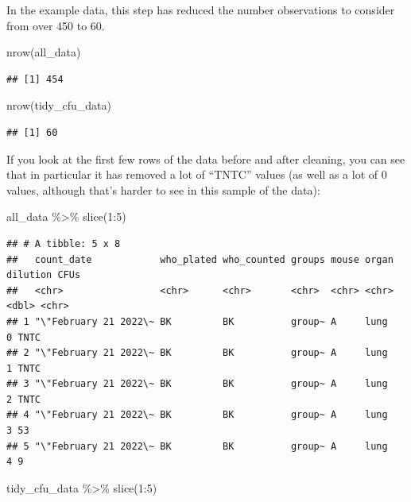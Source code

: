 \documentclass[
]{book}
\newenvironment{Shaded}{\begin{snugshade}}{\end{snugshade}}
\newcommand{\DecValTok}[1]{\textcolor[rgb]{0.00,0.00,0.81}{#1}}
\newcommand{\FunctionTok}[1]{\textcolor[rgb]{0.00,0.00,0.00}{#1}}
\newcommand{\NormalTok}[1]{#1}
\newcommand{\SpecialCharTok}[1]{\textcolor[rgb]{0.00,0.00,0.00}{#1}}
\begin{document}
In the example data, this step has reduced the number observations to consider
from over 450 to 60.

\begin{Shaded}
\begin{Highlighting}[]
\FunctionTok{nrow}\NormalTok{(all\_data)}
\end{Highlighting}
\end{Shaded}

\begin{verbatim}
## [1] 454
\end{verbatim}

\begin{Shaded}
\begin{Highlighting}[]
\FunctionTok{nrow}\NormalTok{(tidy\_cfu\_data)}
\end{Highlighting}
\end{Shaded}

\begin{verbatim}
## [1] 60
\end{verbatim}

If you look at the first few rows of the data before and after cleaning, you can
see that in particular it has removed a lot of ``TNTC'' values (as well as a lot
of 0 values, although that's harder to see in this sample of the data):

\begin{Shaded}
\begin{Highlighting}[]
\NormalTok{all\_data }\SpecialCharTok{\%\textgreater{}\%} 
  \FunctionTok{slice}\NormalTok{(}\DecValTok{1}\SpecialCharTok{:}\DecValTok{5}\NormalTok{)}
\end{Highlighting}
\end{Shaded}

\begin{verbatim}
## # A tibble: 5 x 8
##   count_date            who_plated who_counted groups mouse organ dilution CFUs 
##   <chr>                 <chr>      <chr>       <chr>  <chr> <chr>    <dbl> <chr>
## 1 "\"February 21 2022\~ BK         BK          group~ A     lung         0 TNTC 
## 2 "\"February 21 2022\~ BK         BK          group~ A     lung         1 TNTC 
## 3 "\"February 21 2022\~ BK         BK          group~ A     lung         2 TNTC 
## 4 "\"February 21 2022\~ BK         BK          group~ A     lung         3 53   
## 5 "\"February 21 2022\~ BK         BK          group~ A     lung         4 9
\end{verbatim}

\begin{Shaded}
\begin{Highlighting}[]
\NormalTok{tidy\_cfu\_data }\SpecialCharTok{\%\textgreater{}\%} 
  \FunctionTok{slice}\NormalTok{(}\DecValTok{1}\SpecialCharTok{:}\DecValTok{5}\NormalTok{)}
\end{Highlighting}
\end{Shaded}
\end{document}
